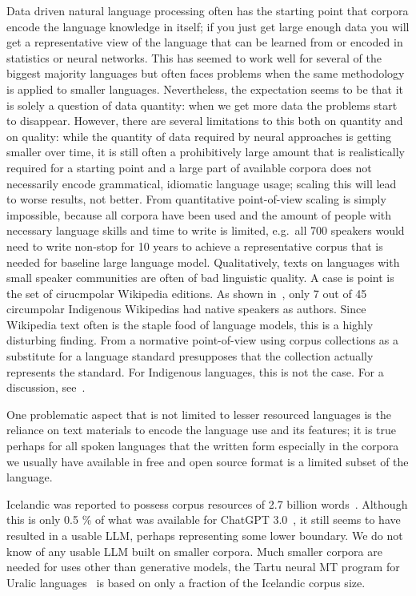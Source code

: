 \documentclass[free]{flammie}
\begin{document}
Data driven natural language processing often has the starting point that
corpora encode the language knowledge in itself; if you just get large enough
data you will get a representative view of the language that can be learned from
or encoded in statistics or neural networks.  This has seemed to work well for
several of the biggest majority languages but often faces problems when the same
methodology is applied to smaller languages.  Nevertheless, the expectation
seems to be that it is solely a question of data quantity: when we get more data
the problems start to disappear.  However, there are several limitations to this
both on quantity and on quality: while the quantity of data required by neural
approaches is getting smaller over time, it is still often a prohibitively large
amount that is realistically required for a starting point and a large part of
available corpora does not necessarily encode grammatical, idiomatic language
usage; scaling this will lead to worse results, not better.  From quantitative
point-of-view scaling is simply impossible, because all corpora have been used
and the amount of people with necessary language skills and time to write is
limited, e.g.\ all 700 speakers would need to write non-stop for 10 years to
achieve a representative corpus that is needed for baseline large language
model.  Qualitatively, texts on languages with small speaker communities are
often of bad linguistic quality. A case is point is the set of cirucmpolar
Wikipedia editions. As shown in~\cite{Trosterud2021circumpolar}, only 7 out of
45 circumpolar Indigenous Wikipedias had native speakers as authors. Since
Wikipedia text often is the staple food of language models, this is a highly
disturbing finding.  From a normative point-of-view using corpus collections as
a substitute for a language standard presupposes that the collection actually
represents the standard. For Indigenous languages, this is not the case. For a
discussion, see~\cite{Trosterud2022normative}.

One problematic aspect that is not limited to lesser resourced languages is the
reliance on text materials to encode the language use and its features; it is
true perhaps for all spoken languages that the written form especially in the
corpora we usually have available in free and open source format is a limited
subset of the language.

Icelandic was reported to possess corpus resources of 2.7 billion
words~\cite{Rognvaldsson2023icelandic}. Although this is only 0.5 \% of what was
available for ChatGPT 3.0~\cite{brown2020language}, it still seems to have
resulted in a usable LLM, perhaps representing some lower boundary. We do not
know of any usable LLM built on smaller corpora. Much smaller corpora are needed
for uses other than generative models, the Tartu neural MT program for Uralic
languages~\cite{yankovskaya-etal-2023-machine} is based on only a fraction of
the Icelandic corpus size.
\end{document}
